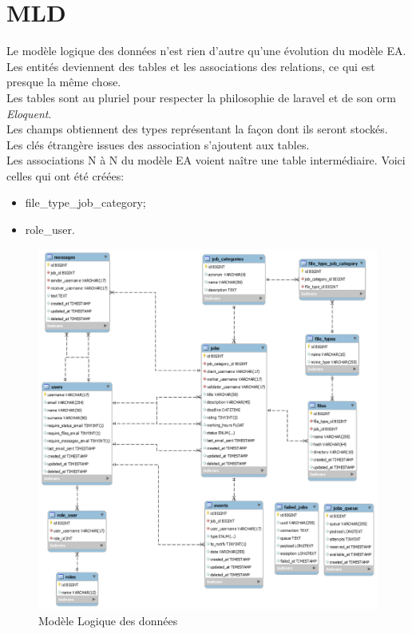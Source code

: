 \documentclass[
    iai, %
    il, %
]{heig-tb}
\begin{document}
\newpage

\section{MLD}
Le modèle logique des données n'est rien d'autre qu'une évolution du modèle EA.\\
Les entités deviennent des tables et les associations des relations, ce qui est presque la même chose.\\
Les tables sont au pluriel pour respecter la philosophie de \Gls{laravel} et de son \Gls{orm} \emph{Eloquent}.\\
Les champs obtiennent des types représentant la façon dont ils seront stockés.\\
Les clés étrangère issues des association s'ajoutent aux tables.\\
Les associations N à N du modèle EA voient naître une table intermédiaire. Voici celles qui ont été créées:
\begin{itemize}
    \item file\_type\_job\_category;
    \item role\_user.
\end{itemize}

\begin{center}
    \begin{figure}
        \includegraphics[width=\textwidth]{./assets/figures/mld.png}
        \caption{Modèle Logique des données \label{mld}}
    \end{figure}
\end{center}
\end{document}
